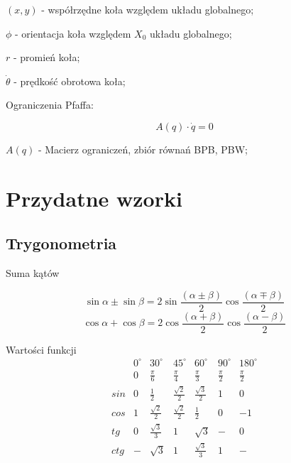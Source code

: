\documentclass{article}
\newenvironment{kol2}{\noindent \begin{minipage}[t]{0.5\linewidth}}{\end{minipage}}
\begin{document}
\vspace{0.5cm}
\large
$(x,y)$ - współrzędne koła względem układu globalnego;

$\phi$ - orientacja koła względem $X_0$ układu globalnego;

$r$ - promień koła;

$\dot{\theta}$ - prędkość obrotowa koła;
\normalsize

\vspace{0.5cm}
\noindent
Ograniczenia Pfaffa:

\Large
$$ A(q) \cdot \dot{q} = 0 $$
\normalsize

\vspace{0.5cm}
\large
$ A(q) $ - Macierz ograniczeń, zbiór równań BPB, PBW;
\normalsize

\section{Przydatne wzorki}
\subsection{Trygonometria}

\begin{kol2}

    \noindent
    Suma kątów

    $$  \sin{\alpha}\pm\sin{\beta}=
        2\sin{\frac{\left(\alpha\pm\beta\right)}{2}}
        \cos{\frac{\left(\alpha\mp\beta\right)}{2}} $$
    $$  \cos{\alpha}+\cos{\beta}=
        2\cos{\frac{\left(\alpha+\beta\right)}{2}}
        \cos{\frac{\left(\alpha-\beta\right)}{2}} $$
\end{kol2}
\begin{kol2}

    \noindent
    Wartości funkcji\textbf{}
    $$
        \begin{array}{c|c|c|c|c|c|c}
                & 0^\circ & 30^\circ       & 45^\circ       & 60^\circ       & 90^\circ  & 180^\circ \\
                & 0       & \frac\pi6      & \frac\pi4      & \frac{\pi}3    & \frac\pi2 & \frac\pi2 \\ \hline
            sin & 0       & \frac12        & \frac{\sqrt2}2 & \frac{\sqrt3}2 & 1         & 0         \\
            cos & 1       & \frac{\sqrt2}2 & \frac{\sqrt2}2 & \frac12        & 0         & -1        \\ \hline
            tg  & 0       & \frac{\sqrt3}3 & 1              & \sqrt3         & -         & 0         \\
            ctg & -       & \sqrt3         & 1              & \frac{\sqrt3}3 & 1         & -         \\
        \end{array}
    $$
\end{kol2}
\end{document}
